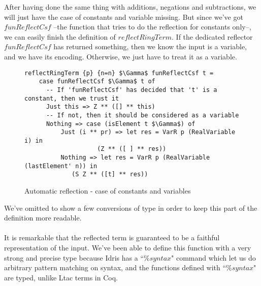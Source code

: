After having done the same thing with additions, negations and subtractions, we will just have the case of constants and variable missing. But since we've got $funReflectCsf$ --the function that tries to do the reflection for constants only--, we can easily finish the definition of $reflectRingTerm$. If the dedicated reflector $funReflectCsf$ has returned something, then we know the input is a variable, and we have its encoding. Otherwise, we just have to treat it as a variable.

\begin{figure}[H]
\figrule
\begin{center}
\begin{lstlisting}
reflectRingTerm {p} {n=n} $\Gamma$ funReflectCsf t =
    case funReflectCsf $\Gamma$ t of
      -- If 'funReflectCsf' has decided that 't' is a constant, then we trust it
      Just this => Z ** ([] ** this)
      -- If not, then it should be considered as a variable
      Nothing => case (isElement t $\Gamma$) of
          Just (i ** pr) => let res = VarR p (RealVariable i) in
			        (Z ** ([ ] ** res))
          Nothing => let res = VarR p (RealVariable (lastElement' n)) in
			 (S Z ** ([t] ** res))

\end{lstlisting}
\end{center}
\caption{Automatic reflection - case of constants and variables}
\label{reflectRingTerm_pattern2}
\figrule
\end{figure}

We've omitted to show a few conversions of type in order to keep this part of the definition more readable. \\
\\
It is remarkable that the reflected term is guaranteed to be a faithful representation of the input. We've been able to define this function with a very strong and precise type because Idris has a ``$\%syntax$" command which let us do arbitrary pattern matching on syntax, and the functions defined with ``$\%syntax$" are typed, unlike Ltac terms in Coq.





